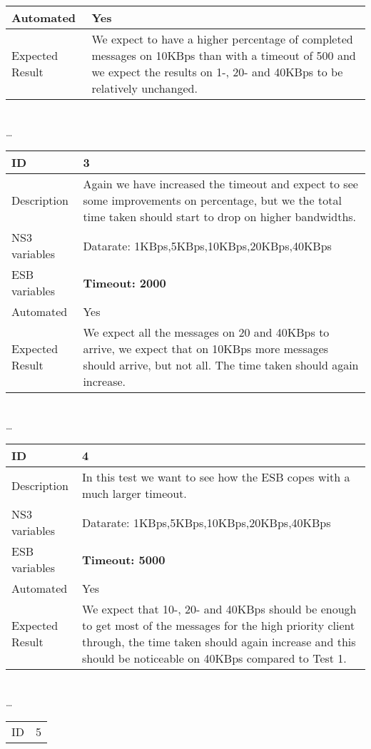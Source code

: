 \begin{center}
\begin{tabular}{| p{4cm} | p{8cm} |}
\hline
Automated & Yes \\
\hline
Expected Result & We expect to have a higher percentage of completed messages on 10KBps than with a timeout of 500 and we expect the results on 1-, 20- and 40KBps to be relatively unchanged. \\
\hline
\end{tabular}
\\ \ldots \\
\begin{tabular}{| p{4cm} | p{8cm} |}%
\hline
ID & 3 \\
\hline
Description & Again we have increased the timeout and expect to see some improvements on percentage, but we the total time taken should start to drop on higher bandwidths.  \\
\hline
NS3 variables & Datarate: 1KBps,5KBps,10KBps,20KBps,40KBps \\
\hline
ESB variables & \textbf{Timeout: 2000} \\
\hline
Automated & Yes \\
\hline
Expected Result & We expect all the messages on 20 and 40KBps to arrive, we expect that on 10KBps more messages should arrive, but not all. The time taken should again increase. \\
\hline
\end{tabular}
\\ \ldots \\
\begin{tabular}{| p{4cm} | p{8cm} |}%
\hline
ID & 4 \\
\hline
Description & In this test we want to see how the ESB copes with a much larger timeout.  \\
\hline
NS3 variables & Datarate: 1KBps,5KBps,10KBps,20KBps,40KBps \\
\hline
ESB variables & \textbf{Timeout: 5000} \\
\hline
Automated & Yes \\
\hline
Expected Result & We expect that 10-, 20- and 40KBps should be enough to get most of the messages for the high priority client through, the time taken should again increase and this should be noticeable on 40KBps compared to Test 1.  \\
\hline
\end{tabular}
\\ \ldots \\
\begin{tabular}{| p{4cm} | p{8cm} |}%
\hline
ID & 5 \\

\end{tabular}
\end{center}
